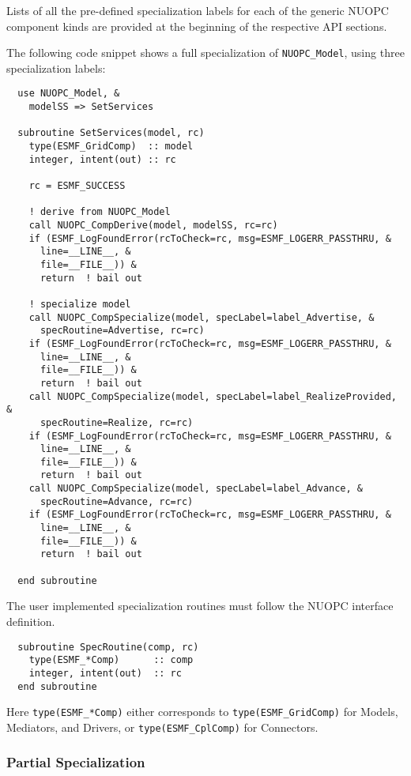 Lists of all the pre-defined specialization labels for each of the generic NUOPC component kinds are provided at the beginning of the respective API sections.

The following code snippet shows a full specialization of {\tt NUOPC\_Model}, using three specialization labels:

\begin{verbatim}
  use NUOPC_Model, &
    modelSS => SetServices

  subroutine SetServices(model, rc)
    type(ESMF_GridComp)  :: model
    integer, intent(out) :: rc

    rc = ESMF_SUCCESS

    ! derive from NUOPC_Model
    call NUOPC_CompDerive(model, modelSS, rc=rc)
    if (ESMF_LogFoundError(rcToCheck=rc, msg=ESMF_LOGERR_PASSTHRU, &
      line=__LINE__, &
      file=__FILE__)) &
      return  ! bail out

    ! specialize model
    call NUOPC_CompSpecialize(model, specLabel=label_Advertise, &
      specRoutine=Advertise, rc=rc)
    if (ESMF_LogFoundError(rcToCheck=rc, msg=ESMF_LOGERR_PASSTHRU, &
      line=__LINE__, &
      file=__FILE__)) &
      return  ! bail out
    call NUOPC_CompSpecialize(model, specLabel=label_RealizeProvided, &
      specRoutine=Realize, rc=rc)
    if (ESMF_LogFoundError(rcToCheck=rc, msg=ESMF_LOGERR_PASSTHRU, &
      line=__LINE__, &
      file=__FILE__)) &
      return  ! bail out
    call NUOPC_CompSpecialize(model, specLabel=label_Advance, &
      specRoutine=Advance, rc=rc)
    if (ESMF_LogFoundError(rcToCheck=rc, msg=ESMF_LOGERR_PASSTHRU, &
      line=__LINE__, &
      file=__FILE__)) &
      return  ! bail out

  end subroutine
\end{verbatim}

The user implemented specialization routines must follow the NUOPC interface definition.

\begin{verbatim}
  subroutine SpecRoutine(comp, rc)
    type(ESMF_*Comp)      :: comp
    integer, intent(out)  :: rc
  end subroutine
\end{verbatim}

Here {\tt type(ESMF\_*Comp)} either corresponds to {\tt type(ESMF\_GridComp)} for Models, Mediators, and Drivers, or {\tt type(ESMF\_CplComp)} for Connectors.

\subsubsection{Partial Specialization}

